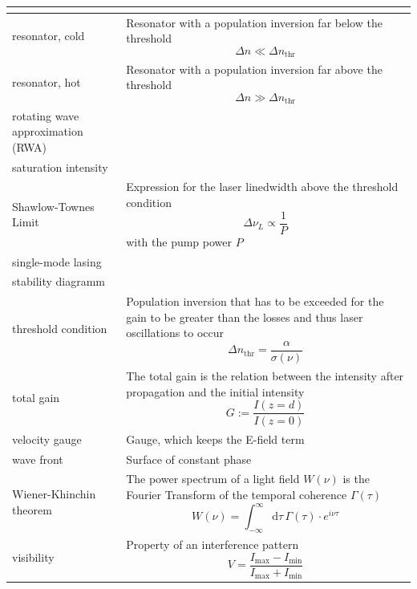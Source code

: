 \documentclass{article}
\newcommand{\diff}{\mathrm{d}}
\begin{document}
\begin{xltabular}{\linewidth}{p{6cm}|X}
{			}
			\\
	\hline
		resonator, cold & Resonator with a population inversion far below the threshold
			$$\Delta n \ll \Delta n_\text{thr}$$ \\
	\hline
		resonator, hot & Resonator with a population inversion far above the threshold
			$$\Delta n \gg \Delta n_\text{thr}$$ \\
	\hline
		rotating wave approximation (RWA) &  \\
	\hline
		saturation intensity & \\
	\hline
		Shawlow-Townes Limit & Expression for the laser linedwidth above the threshold condition
			$$\Delta\nu_L \propto \frac{1}{P}$$
		with the pump power $P$ \\
	\hline
		single-mode lasing & \\
	\hline
		stability diagramm &  \\
	\hline
		threshold condition & Population inversion that has to be exceeded for the gain to be greater than the losses and thus laser oscillations to occur
			$$\Delta n_\text{thr} = \frac{\alpha}{\sigma(\nu)}$$ \\
	\hline
		total gain & The total gain is the relation between the intensity after propagation and the initial intensity
			$$G := \frac{I(z=d)}{I(z=0)}$$ \\
	\hline
		velocity gauge & Gauge, which keeps the E-field term \\
	\hline
		wave front & Surface of constant phase \\
	\hline
		Wiener-Khinchin theorem & The power spectrum of a light field $W(\nu)$ is the Fourier Transform of the temporal coherence $\Gamma(\tau)$
			$$W(\nu) = \int_{-\infty}^\infty \diff\tau \, \Gamma(\tau) \cdot e^{i\nu\tau}$$ \\
	\hline
		visibility & Property of an interference pattern
			$$V = \frac{ I_\text{max} - I_\text{min} }{ I_\text{max} + I_\text{min} }$$ \\
	\hline\hline
\end{xltabular}
\end{document}
